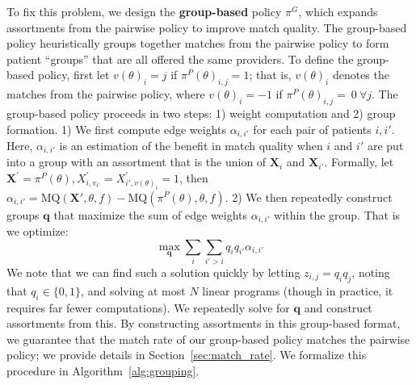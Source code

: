 \documentclass[11pt]{article}
\begin{document}
To fix this problem, we design the \textbf{group-based} policy $\pi^{G}$, which expands assortments from the pairwise policy to improve match quality. 
The group-based policy heuristically groups together matches from the pairwise policy to form patient ``groups'' that are all offered the same providers. 
To define the group-based policy, first let $v(\theta)_{i} = j$ if $\pi^{P}(\theta)_{i,j} = 1$; that is, $v(\theta)_{i}$ denotes the matches from the pairwise policy, where $v(\theta)_{i} = -1$ if $\pi^{P}(\theta)_{i,j} = \ 0 \ \forall j$. 
The group-based policy proceeds in two steps: 1) weight computation and 2) group formation. 
1) We first compute edge weights $\alpha_{i,i'}$ for each pair of patients $i,i'$. 
Here, $\alpha_{i,i'}$ is an estimation of the benefit in match quality when $i$ and $i'$ are put into a group with an assortment that is the union of $\mathbf{X}_{i}$ and $\mathbf{X}_{i'}$. 
Formally, let $\mathbf{X}^{\prime} = \pi^{P}(\theta), {X}^{\prime}_{i,v_{i'}}= X^{\prime}_{i',v(\theta)_{i}}=1$, then  $\alpha_{i,i'} = \mathrm{MQ}(\mathbf{X}',\theta,f) - \mathrm{MQ} (\pi^{P}(\theta),\theta,f)$. 
2) We then repeatedly construct groups $\mathbf{q}$ that maximize the sum of edge weights $\alpha_{i,i'}$ within the group. 
That is we optimize: 
\begin{equation}
    \max\limits_{\mathbf{q}} \sum_{i} \sum_{i'>i} q_{i} q_{i'} \alpha_{i,i'}
\end{equation}
We note that we can find such a solution quickly by letting $z_{i,j} = q_{i} q_{j}$, noting that $q_{i} \in \{0,1\}$, and solving at most $N$ linear programs (though in practice, it requires far fewer computations). 
We repeatedly solve for $\mathbf{q}$ and construct assortments from this. 
By constructing assortments in this group-based format, we guarantee that the match rate of our group-based policy matches the pairwise policy; we provide details in Section~\ref{sec:match_rate}. 
We formalize this procedure in Algorithm~\ref{alg:grouping}. 
\end{document}
